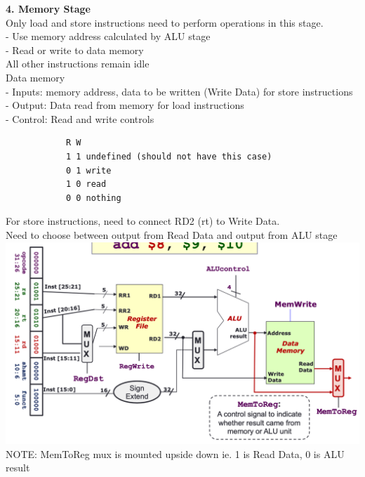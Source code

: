 \documentclass[10pt, a4paper]{article}
\begin{document}
\begin{multicols*}{3}
		\textbf{4. Memory Stage}\\
		Only load and store instructions need to perform operations in this stage.\\
		- Use memory address calculated by ALU stage\\
		- Read or write to data memory\\
		All other instructions remain idle\\
		Data memory\\
		- Inputs: memory address, data to be written (Write Data) for store instructions\\
		- Output: Data read from memory for load instructions\\
		- Control: Read and write controls
		\begin{verbatim}
			R W
			1 1 undefined (should not have this case)
			0 1 write
			1 0 read
			0 0 nothing
		\end{verbatim} 
		For store instructions, need to connect RD2 (rt) to Write Data.\\
		Need to choose between output from Read Data and output from ALU stage\\
		\includegraphics[scale=.25]{./assets/memStage}\\
		NOTE: MemToReg mux is mounted upside down ie. 1 is Read Data, 0 is ALU result\\
		 

\end{multicols*}
\end{document}
